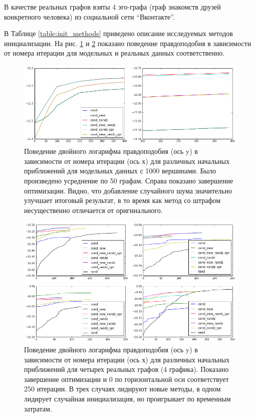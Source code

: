 \documentclass{ITaSconf}
\begin{document}
	В качестве реальных графов взяты 4 эго-графа (граф знакомств друзей конкретного человека) из социальной сети ``Вконтакте''.
	
	В Таблице \ref{table:init_methods} приведено описание исследуемых методов инициализации.
	На рис. \ref{fig:llh_init_model} и \ref{fig:llh_init_real} показано поведение правдоподобия в зависимости от номера итерации для модельных и реальных данных соответственно.
	
	\begin{figure}[!h]
		\centering
		\includegraphics[width=\linewidth]{imgs/init_new_good.png}
		\caption{Поведение двойного логарифма правдоподобия (ось y) в зависимости от номера итерации (ось х) для различных начальных приближений для модельных данных \cite{lancichinetti2009benchmarks} с 1000 вершинами. Было произведено усреднение по 50 графам. Справа показано завершение оптимизации. Видно, что добавление случайного шума значительно улучшает итоговый результат, в то время как метод со штрафом несущественно отличается от оригинального.}
		\label{fig:llh_init_model}
	\end{figure}
	\begin{figure}[!h]
		\centering
		\includegraphics[width=\linewidth]{imgs/init_llh_real.png}
		\caption{Поведение двойного логарифма правдоподобия (ось y) в зависимости от номера итерации (ось х) для различных начальных приближений для четырех реальных графов (4 графика). Показано завершение оптимизации и 0 по горизонтальной оси соответствует 250 итерации. В трех случаях лидируют новые методы, в одном лидирует случайная инициализация, но проигрывает по временным затратам. }
		\label{fig:llh_init_real}
	\end{figure}
\end{document}
